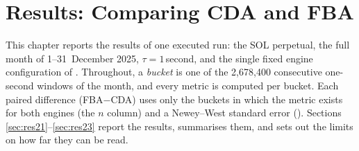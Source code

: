 \chapter{Results: Comparing CDA and FBA}
\label{ch:results}

This chapter reports the results of one executed run: the SOL perpetual, the
full month of 1--31~December 2025, $\tau = 1$\,second, and the single fixed
engine configuration of . Throughout, a \emph{bucket} is one
of the 2,678,400 consecutive one-second windows of the month, and every metric
is computed per bucket. Each paired difference (FBA$-$CDA) uses only the
buckets in which the metric exists for both engines (the $n$ column) and a
Newey--West standard error (). Sections
\ref{sec:res21}--\ref{sec:res23} report the results, 
summarises them, and  sets out the limits on how
far they can be read.


